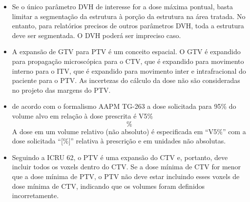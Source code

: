 \documentclass[11pt,a4paper]{article}
\newcounter{exemplo}
\begin{document}
\begin{exemplo}[Medicina]
\begin{itemize}
        \item Se o único parâmetro DVH de interesse for a dose máxima pontual, basta limitar a segmentação da estrutura à porção da estrutura na área tratada. No entanto, para relatórios precisos de outros parâmetros DVH, toda a estrutura deve ser segmentada. O DVH poderá ser impreciso caso.
        
        \item A expansão de GTV para PTV é um conceito espacial. O GTV é expandido para propagação microscópica para o CTV, que é expandido para movimento interno para o ITV, que é expandido para movimento inter e intrafracional do paciente para o PTV. As incertezas do cálculo da dose não são consideradas no projeto das margens do PTV.
        
        \item de acordo com o formalismo  AAPM TG-263 a dose  solicitada para 95\% do volume alvo em relação à dose prescrita é V5\%\[\%\]A dose em um volume relativo (não absoluto) é especificada em “V5\%” com a dose solicitada “[\%]” relativa à prescrição e em unidades não absolutas.
        
        \item Seguindo a ICRU 62, o PTV é uma expansão do CTV e, portanto, deve incluir todos os voxels dentro do CTV. Se a dose mínima de CTV for menor que a dose mínima de PTV, o PTV não deve estar incluindo esses voxels de dose mínima de CTV, indicando que os volumes foram definidos incorretamente.
        
    \end{itemize}
\end{exemplo}





\end{document}
